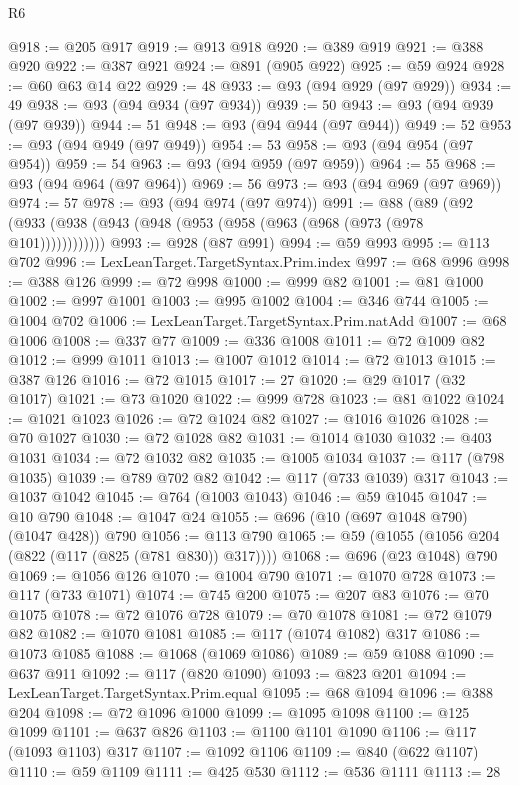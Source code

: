 \begin{lexlean}{R6}
\begin{coremodule}
@918 := @205 @917
@919 := @913 @918
@920 := @389 @919
@921 := @388 @920
@922 := @387 @921
@924 := @891 (@905 @922)
@925 := @59 @924
@928 := @60 @63 @14 @22
@929 := 48
@933 := @93 (@94 @929 (@97 @929))
@934 := 49
@938 := @93 (@94 @934 (@97 @934))
@939 := 50
@943 := @93 (@94 @939 (@97 @939))
@944 := 51
@948 := @93 (@94 @944 (@97 @944))
@949 := 52
@953 := @93 (@94 @949 (@97 @949))
@954 := 53
@958 := @93 (@94 @954 (@97 @954))
@959 := 54
@963 := @93 (@94 @959 (@97 @959))
@964 := 55
@968 := @93 (@94 @964 (@97 @964))
@969 := 56
@973 := @93 (@94 @969 (@97 @969))
@974 := 57
@978 := @93 (@94 @974 (@97 @974))
@991 := @88 (@89 (@92 (@933 (@938 (@943 (@948 (@953 (@958 (@963 (@968 (@973 (@978 @101))))))))))))
@993 := @928 (@87 @991)
@994 := @59 @993
@995 := @113 @702
@996 := LexLeanTarget.TargetSyntax.Prim.index
@997 := @68 @996
@998 := @388 @126
@999 := @72 @998
@1000 := @999 @82
@1001 := @81 @1000
@1002 := @997 @1001
@1003 := @995 @1002
@1004 := @346 @744
@1005 := @1004 @702
@1006 := LexLeanTarget.TargetSyntax.Prim.natAdd
@1007 := @68 @1006
@1008 := @337 @77
@1009 := @336 @1008
@1011 := @72 @1009 @82
@1012 := @999 @1011
@1013 := @1007 @1012
@1014 := @72 @1013
@1015 := @387 @126
@1016 := @72 @1015
@1017 := 27
@1020 := @29 @1017 (@32 @1017)
@1021 := @73 @1020
@1022 := @999 @728
@1023 := @81 @1022
@1024 := @1021 @1023
@1026 := @72 @1024 @82
@1027 := @1016 @1026
@1028 := @70 @1027
@1030 := @72 @1028 @82
@1031 := @1014 @1030
@1032 := @403 @1031
@1034 := @72 @1032 @82
@1035 := @1005 @1034
@1037 := @117 (@798 @1035)
@1039 := @789 @702 @82
@1042 := @117 (@733 @1039) @317
@1043 := @1037 @1042
@1045 := @764 (@1003 @1043)
@1046 := @59 @1045
@1047 := @10 @790
@1048 := @1047 @24
@1055 := @696 (@10 (@697 @1048 @790) (@1047 @428)) @790
@1056 := @113 @790
@1065 := @59 (@1055 (@1056 @204 (@822 (@117 (@825 (@781 @830)) @317))))
@1068 := @696 (@23 @1048) @790
@1069 := @1056 @126
@1070 := @1004 @790
@1071 := @1070 @728
@1073 := @117 (@733 @1071)
@1074 := @745 @200
@1075 := @207 @83
@1076 := @70 @1075
@1078 := @72 @1076 @728
@1079 := @70 @1078
@1081 := @72 @1079 @82
@1082 := @1070 @1081
@1085 := @117 (@1074 @1082) @317
@1086 := @1073 @1085
@1088 := @1068 (@1069 @1086)
@1089 := @59 @1088
@1090 := @637 @911
@1092 := @117 (@820 @1090)
@1093 := @823 @201
@1094 := LexLeanTarget.TargetSyntax.Prim.equal
@1095 := @68 @1094
@1096 := @388 @204
@1098 := @72 @1096 @1000
@1099 := @1095 @1098
@1100 := @125 @1099
@1101 := @637 @826
@1103 := @1100 @1101 @1090
@1106 := @117 (@1093 @1103) @317
@1107 := @1092 @1106
@1109 := @840 (@622 @1107)
@1110 := @59 @1109
@1111 := @425 @530
@1112 := @536 @1111
@1113 := 28

\end{coremodule}
\end{lexlean}
